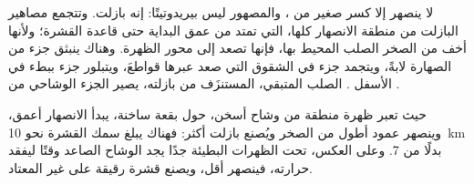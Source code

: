 لا ينصهر إلا كسر صغير من ، والمصهور ليس بيريدوتيتًا:
إنه بازلت. وتتجمع مصاهير البازلت من منطقة الانصهار كلها، التي تمتد
من عمق البداية حتى قاعدة القشرة؛ ولأنها أخف من الصخر
الصلب المحيط بها، فإنها تصعد إلى محور الظهرة. وهناك ينبثق جزء من الصهارة
لابةً، ويتجمد جزء في الشقوق التي صعد عبرها قواطعَ، ويتبلور جزء
ببطء في الأسفل .  الصلب المتبقي،
المستنزَف من بازلته، يصير الجزء الوشاحي من .

حيث تعبر ظهرة منطقة من وشاح أسخن، حول بقعة ساخنة، يبدأ الانصهار
أعمق، وينصهر عمود أطول من الصخر ويُصنع بازلت أكثر: فهناك
يبلغ سمك القشرة نحو \qty{10}{km} بدلًا من 7. وعلى العكس، تحت الظهرات
البطيئة جدًا يجد الوشاح الصاعد وقتًا ليفقد حرارته، فينصهر أقل، ويصنع
قشرة رقيقة على غير المعتاد.


